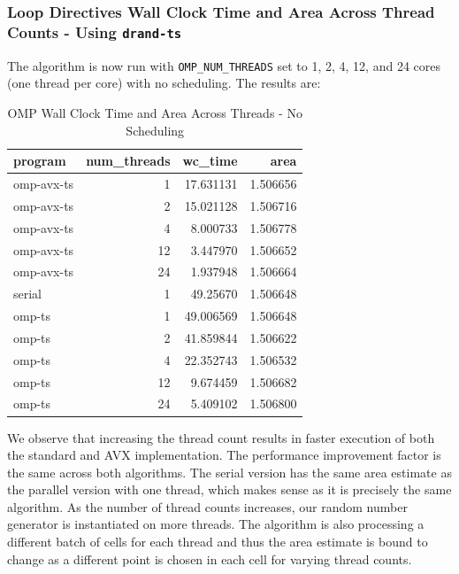 \documentclass{article}
\begin{document}
\subsubsection{Loop Directives Wall Clock Time and Area Across Thread Counts - Using \texttt{drand-ts}}
The algorithm is now run with \texttt{OMP\_NUM\_THREADS} set to 1, 2, 4, 12, and 24 cores (one thread per core) with no scheduling. 
The results are: 
\begin{table}[H]
    \centering
    \caption{OMP Wall Clock Time and Area Across Threads - No Scheduling}
    \centering
    \fontsize{12}{14}\selectfont
    \begin{tabular}[t]{l|r|r|r}
    \hline
    program & num\_threads & wc\_time & area\\
    \hline
    omp-avx-ts & 1 & 17.631131 & 1.506656\\
    \hline
    omp-avx-ts & 2 & 15.021128 & 1.506716\\
    \hline
    omp-avx-ts & 4 & 8.000733 & 1.506778\\
    \hline
    omp-avx-ts & 12 & 3.447970 & 1.506652\\
    \hline
    omp-avx-ts & 24 & 1.937948 & 1.506664\\
    \hline
    serial & 1 & 49.25670 & 1.506648 \\
    \hline 
    omp-ts & 1 & 49.006569 & 1.506648\\
    \hline
    omp-ts & 2 & 41.859844 & 1.506622\\
    \hline
    omp-ts & 4 & 22.352743 & 1.506532\\
    \hline
    omp-ts & 12 & 9.674459 & 1.506682\\
    \hline
    omp-ts & 24 & 5.409102 & 1.506800\\
    \hline
    \end{tabular}
\end{table}
\noindent We observe that increasing the thread count results in faster execution of both the 
standard and AVX implementation. The performance improvement factor is the same across both algorithms. 
The serial version has the same area estimate as the parallel version with one thread, which makes sense as it 
is precisely the same algorithm. As the number of thread counts increases, our random number generator is 
instantiated on more threads. The algorithm is also processing a different batch of cells for each thread and thus 
the area estimate is bound to change as a different point is chosen in each cell for varying thread counts.
\end{document}
